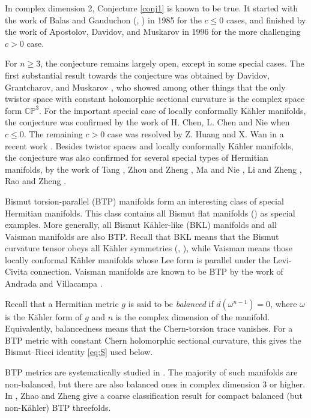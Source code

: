 \documentclass{amsart}
\begin{document}
In complex dimension 2, Conjecture \ref{conj1} is known to be true. It started with the work of Balas and Gauduchon (\cite{BG}, \cite{Balas}) in 1985 for the $c\leq 0$ cases, and finished by the work of Apostolov, Davidov, and Muskarov \cite{ADM} in 1996 for the more challenging $c>0$ case.

For $n\geq 3$, the conjecture remains largely open, except in some special cases. The first substantial result towards the conjecture was obtained by Davidov, Grantcharov, and Muskarov \cite{DGM}, who showed among other things that the only twistor space with constant holomorphic sectional curvature is the complex space form ${\mathbb C}{\mathbb P}^3$. For the important special case of locally conformally K\"ahler manifolds, the conjecture was confirmed by the work of H. Chen, L. Chen and Nie \cite{CCN} when $c\leq 0$. The remaining $c>0$ case was resolved by Z. Huang and X. Wan in a recent work \cite{HW}. Besides twistor spaces and locally conformally K\"ahler manifolds, the conjecture was also confirmed for several special types of Hermitian manifolds, by the work of Tang \cite{Tang}, Zhou and Zheng \cite{ZhouZ}, Ma and Nie \cite{MN}, Li and Zheng \cite{LZ}, Rao and Zheng \cite{RZ}.

Bismut torsion-parallel (BTP) manifolds form an interesting class of special Hermitian manifolds. This class contains all Bismut flat manifolds (\cite{WYZ}) as special examples. More generally, all Bismut K\"ahler-like (BKL) manifolds and all Vaisman manifolds are also BTP. Recall that BKL means that the Bismut curvature tensor obeys all K\"ahler symmetries (\cite{ZZCrelle}, \cite{AOUV}), while Vaisman means those locally conformal K\"ahler manifolds whose Lee form is parallel under the Levi-Civita connection. Vaisman manifolds are known to be BTP by the work of Andrada and Villacampa \cite{AndradaV}.

Recall that a Hermitian metric $g$ is said to be {\em balanced} if $d(\omega^{n-1})=0$, where $\omega$ is the K\"ahler form of $g$ and $n$ is the complex dimension of the manifold.  Equivalently, balancedness means that the Chern-torsion trace vanishes.
For a BTP metric with constant Chern holomorphic sectional curvature, this
gives the Bismut--Ricci identity \eqref{eq:S} used below.

 BTP metrics are systematically studied in \cite{ZhaoZ24}. The majority of such manifolds are non-balanced, but there are also balanced ones in complex dimension 3 or higher. In \cite{ZhaoZ25}, Zhao and Zheng give a coarse classification result for compact balanced (but non-K\"ahler) BTP threefolds.
\end{document}
